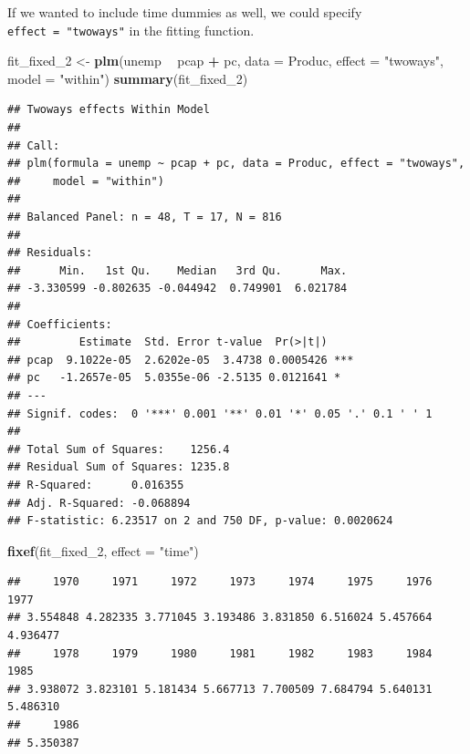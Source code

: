 \documentclass[12pt,oneside,openany]{book}
\newenvironment{Shaded}{\begin{snugshade}}{\end{snugshade}}
\newcommand{\KeywordTok}[1]{\textcolor[rgb]{0.13,0.29,0.53}{\textbf{#1}}}
\newcommand{\DataTypeTok}[1]{\textcolor[rgb]{0.13,0.29,0.53}{#1}}
\newcommand{\DecValTok}[1]{\textcolor[rgb]{0.00,0.00,0.81}{#1}}
\newcommand{\StringTok}[1]{\textcolor[rgb]{0.31,0.60,0.02}{#1}}
\newcommand{\OperatorTok}[1]{\textcolor[rgb]{0.81,0.36,0.00}{\textbf{#1}}}
\newcommand{\NormalTok}[1]{#1}
\begin{document}
If we wanted to include time dummies as well, we could specify
\texttt{effect\ =\ "twoways"} in the fitting function.

\begin{Shaded}
\begin{Highlighting}[]
\NormalTok{fit_fixed_}\DecValTok{2}\NormalTok{ <-}\StringTok{ }\KeywordTok{plm}\NormalTok{(unemp }\OperatorTok{~}\StringTok{ }\NormalTok{pcap }\OperatorTok{+}\StringTok{ }\NormalTok{pc,}
                   \DataTypeTok{data =}\NormalTok{ Produc,}
                   \DataTypeTok{effect =} \StringTok{"twoways"}\NormalTok{,}
                   \DataTypeTok{model =} \StringTok{"within"}\NormalTok{)}
\KeywordTok{summary}\NormalTok{(fit_fixed_}\DecValTok{2}\NormalTok{)}
\end{Highlighting}
\end{Shaded}

\begin{verbatim}
## Twoways effects Within Model
## 
## Call:
## plm(formula = unemp ~ pcap + pc, data = Produc, effect = "twoways", 
##     model = "within")
## 
## Balanced Panel: n = 48, T = 17, N = 816
## 
## Residuals:
##      Min.   1st Qu.    Median   3rd Qu.      Max. 
## -3.330599 -0.802635 -0.044942  0.749901  6.021784 
## 
## Coefficients:
##         Estimate  Std. Error t-value  Pr(>|t|)    
## pcap  9.1022e-05  2.6202e-05  3.4738 0.0005426 ***
## pc   -1.2657e-05  5.0355e-06 -2.5135 0.0121641 *  
## ---
## Signif. codes:  0 '***' 0.001 '**' 0.01 '*' 0.05 '.' 0.1 ' ' 1
## 
## Total Sum of Squares:    1256.4
## Residual Sum of Squares: 1235.8
## R-Squared:      0.016355
## Adj. R-Squared: -0.068894
## F-statistic: 6.23517 on 2 and 750 DF, p-value: 0.0020624
\end{verbatim}

\begin{Shaded}
\begin{Highlighting}[]
\KeywordTok{fixef}\NormalTok{(fit_fixed_}\DecValTok{2}\NormalTok{, }\DataTypeTok{effect =} \StringTok{"time"}\NormalTok{)}
\end{Highlighting}
\end{Shaded}

\begin{verbatim}
##     1970     1971     1972     1973     1974     1975     1976     1977 
## 3.554848 4.282335 3.771045 3.193486 3.831850 6.516024 5.457664 4.936477 
##     1978     1979     1980     1981     1982     1983     1984     1985 
## 3.938072 3.823101 5.181434 5.667713 7.700509 7.684794 5.640131 5.486310 
##     1986 
## 5.350387
\end{verbatim}
\end{document}
